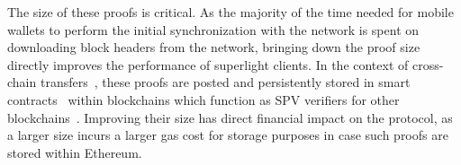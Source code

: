 The size of these proofs is critical. As the majority of the time needed for
mobile wallets to perform the initial synchronization with the network is spent
on downloading block headers from the network, bringing down the proof size
directly improves the performance of superlight clients. In the context of
cross-chain transfers~\cite{pow-sidechains}, these proofs are posted and
persistently stored in smart contracts~\cite{buterin,wood} within blockchains
which function as SPV verifiers for other blockchains~\cite{christoglou}.
Improving their size has direct financial impact
on the protocol, as a larger size incurs a larger gas cost for storage purposes
in case such proofs are stored within Ethereum.
